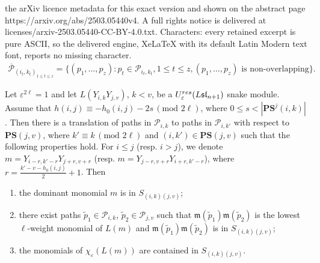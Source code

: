 \documentclass[10pt,a4paper]{amsart}
\newcommand{\res}{{\rm res}}
\begin{document}
the arXiv licence metadata for this exact version and shown on the abstract page https://arxiv.org/abs/2503.05440v4. A full rights notice is delivered at licenses/arxiv-2503.05440-CC-BY-4.0.txt. Characters: every retained excerpt is pure ASCII, so the delivered engine, XeLaTeX with its default Latin Modern text font, reports no missing character.
\begin{align}\label{Non-overlapping paths}
\overline{\mathscr{P}}_{(i_{t},k_{t})_{1\leq t\leq z}}=\{(p_{1},\ldots,p_{z}): p_{t}\in \mathscr{P}_{i_{t},k_{t}}, 1\leq t\leq z, (p_{1},\ldots,p_{z})\text{ is } \text {non-overlapping}\}.
\end{align}

\begin{lemma}\label{Le: II translation of degree 2}
Let $\varepsilon^{2 \ell}=1$ and let $L(Y_{i,k}Y_{j,v})$, $k<v$, be a $U_{\varepsilon}^{\res}({L\mathfrak{sl}_{n+1}})$ snake module. Assume that $h(i,j)\equiv -h_{0}(i,j)-2s\,(\text{mod } 2 \ell)$, where $0\leq s<|\mathbf{PS}^{j}(i,k)|$. Then there is a translation of paths in $\mathscr{P}_{i,k}$ to paths in $\mathscr{P}_{i,k'}$ with respect to $\mathbf{PS}(j,v)$, where $k'\equiv k \, (\text{mod } 2 \ell)$ and $(i,k')\in \mathbf{PS}(j,v)$ such that the following properties hold.  For $i\leq j$ (resp. $i>j$), we denote $m=Y_{i-r,k'-r}Y_{j+r,v+r}$ (resp. $m=Y_{j-r,v+r}Y_{i+r,k'-r}$), where $r=\frac{k'-v-h_0(i,j)}2+1$. Then
\begin{enumerate}
    \item the dominant monomial $m$ is in $S_{(i,k)(j,v)}$;
    \item there exist paths $\widetilde{p}_1 \in \mathscr{P}_{i,k}$, $\widetilde{p}_2\in \mathscr{P}_{j,v}$ such that $\mathfrak{m}(\widetilde{p}_1)\mathfrak{m}(\widetilde{p}_2)$ is the lowest $\ell$-weight monomial of $L(m)$ and $\mathfrak{m}(\widetilde{p}_1)\mathfrak{m}(\widetilde{p}_2)$ is in $S_{(i,k)(j,v)}$;
    \item the monomials of $\chi_\varepsilon(L(m))$ are contained in $S_{(i,k)(j,v)}$.
\end{enumerate}
\end{lemma}
\end{document}
